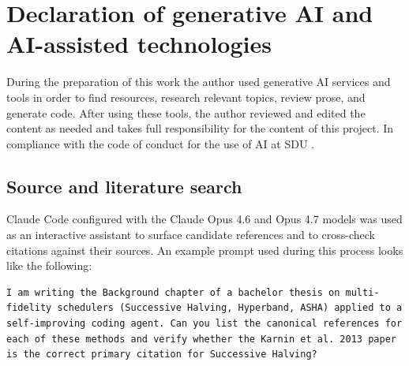 \section*{Declaration of generative AI and AI-assisted technologies}
During the preparation of this work the author used generative AI
services and tools in order to find resources, research relevant topics,
review prose, and generate code. After using these tools, the author
reviewed and edited the content as needed and takes full responsibility
for the content of this project. In compliance with the code of conduct
for the use of AI at SDU \cite{SDU-AI-CoC}.

\subsection*{Source and literature search}
Claude Code \cite{claude-code} configured with the Claude Opus 4.6 and
Opus 4.7 models \cite{claude-opus} was used as an interactive assistant
to surface candidate references and to cross-check citations against
their sources. An example prompt used during this process looks like
the following:

\noindent\begin{minipage}{\linewidth}
\begin{lstlisting}[style=prompt]
I am writing the Background chapter of a bachelor thesis on multi-fidelity schedulers (Successive Halving, Hyperband, ASHA) applied to a self-improving coding agent. Can you list the canonical references for each of these methods and verify whether the Karnin et al. 2013 paper is the correct primary citation for Successive Halving?
\end{lstlisting}
\end{minipage}

